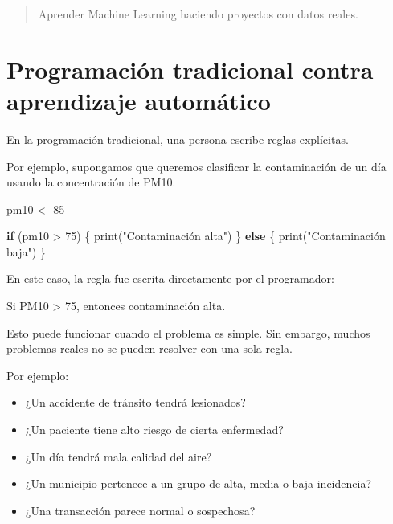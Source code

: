 \documentclass[
  11pt,
  letterpaper,
]{book}
\newenvironment{Shaded}{\begin{snugshade}}{\end{snugshade}}
\newcommand{\ControlFlowTok}[1]{\textcolor[rgb]{0.00,0.23,0.31}{\textbf{#1}}}
\newcommand{\DecValTok}[1]{\textcolor[rgb]{0.68,0.00,0.00}{#1}}
\newcommand{\FunctionTok}[1]{\textcolor[rgb]{0.28,0.35,0.67}{#1}}
\newcommand{\NormalTok}[1]{\textcolor[rgb]{0.00,0.23,0.31}{#1}}
\newcommand{\OtherTok}[1]{\textcolor[rgb]{0.00,0.23,0.31}{#1}}
\newcommand{\SpecialCharTok}[1]{\textcolor[rgb]{0.37,0.37,0.37}{#1}}
\newcommand{\StringTok}[1]{\textcolor[rgb]{0.13,0.47,0.30}{#1}}
\providecommand{\tightlist}{%
  \setlength{\itemsep}{0pt}\setlength{\parskip}{0pt}}
\begin{document}
\begin{quote}
Aprender Machine Learning haciendo proyectos con datos reales.
\end{quote}

\section{Programación tradicional contra aprendizaje
automático}\label{programaciuxf3n-tradicional-contra-aprendizaje-automuxe1tico}

En la programación tradicional, una persona escribe reglas explícitas.

Por ejemplo, supongamos que queremos clasificar la contaminación de un
día usando la concentración de PM10.

\begin{Shaded}
\begin{Highlighting}[]
\NormalTok{pm10 }\OtherTok{\textless{}{-}} \DecValTok{85}

\ControlFlowTok{if}\NormalTok{ (pm10 }\SpecialCharTok{\textgreater{}} \DecValTok{75}\NormalTok{) \{}
  \FunctionTok{print}\NormalTok{(}\StringTok{"Contaminación alta"}\NormalTok{)}
\NormalTok{\} }\ControlFlowTok{else}\NormalTok{ \{}
  \FunctionTok{print}\NormalTok{(}\StringTok{"Contaminación baja"}\NormalTok{)}
\NormalTok{\}}
\end{Highlighting}
\end{Shaded}

En este caso, la regla fue escrita directamente por el programador:

\begin{Shaded}
\begin{Highlighting}[]
\NormalTok{Si PM10 \textgreater{} 75, entonces contaminación alta.}
\end{Highlighting}
\end{Shaded}

Esto puede funcionar cuando el problema es simple. Sin embargo, muchos
problemas reales no se pueden resolver con una sola regla.

Por ejemplo:

\begin{itemize}
\tightlist
\item
  ¿Un accidente de tránsito tendrá lesionados?
\item
  ¿Un paciente tiene alto riesgo de cierta enfermedad?
\item
  ¿Un día tendrá mala calidad del aire?
\item
  ¿Un municipio pertenece a un grupo de alta, media o baja incidencia?
\item
  ¿Una transacción parece normal o sospechosa?
\end{itemize}
\end{document}
